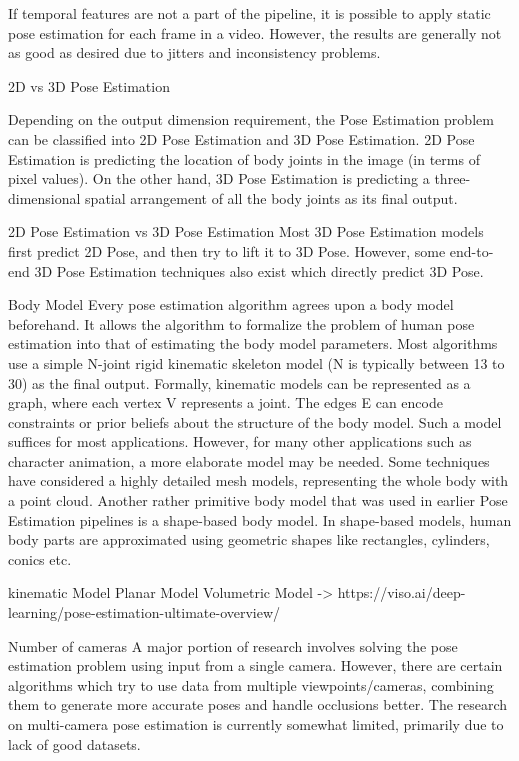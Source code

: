 If temporal features are not a part of the pipeline, it is possible to apply static pose estimation
for each frame in a video. However, the results are generally not as good as desired due to jitters
and inconsistency problems.

2D vs 3D Pose Estimation

Depending on the output dimension requirement, the Pose Estimation problem can be classified into
2D Pose Estimation and 3D Pose Estimation. 2D Pose Estimation is predicting the location of body
joints in the image (in terms of pixel values). On the other hand, 3D Pose Estimation is predicting
a three-dimensional spatial arrangement of all the body joints as its final output.

2D Pose Estimation vs 3D Pose Estimation
Most 3D Pose Estimation models first predict 2D Pose, and then try to lift it to 3D Pose. However,
some end-to-end 3D Pose Estimation techniques also exist which directly predict 3D Pose.

Body Model
Every pose estimation algorithm agrees upon a body model beforehand. It allows the algorithm to formalize the problem of human pose estimation into that of estimating the body model parameters. Most algorithms use a simple N-joint rigid kinematic skeleton model (N is typically between 13 to 30) as the final output. Formally, kinematic models can be represented as a graph, where each vertex V represents a joint. The edges E can encode constraints or prior beliefs about the structure of the body model.
Such a model suffices for most applications. However, for many other applications such as character animation, a more elaborate model may be needed. Some techniques have considered a highly detailed mesh models, representing the whole body with a point cloud.
Another rather primitive body model that was used in earlier Pose Estimation pipelines is a shape-based body model. In shape-based models, human body parts are approximated using geometric shapes like rectangles, cylinders, conics etc.

kinematic Model
Planar Model
Volumetric Model
-> https://viso.ai/deep-learning/pose-estimation-ultimate-overview/

Number of cameras
A major portion of research involves solving the pose estimation problem using input from a single camera. However, there are certain algorithms which try to use data from multiple viewpoints/cameras, combining them to generate more accurate poses and handle occlusions better. The research on multi-camera pose estimation is currently somewhat limited, primarily due to lack of good datasets.

